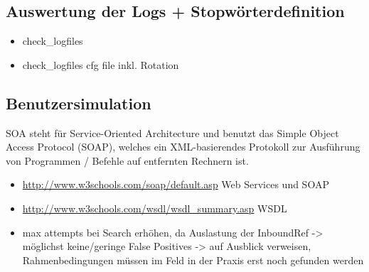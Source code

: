 \subsection{Auswertung der Logs + Stopwörterdefinition}
\begin{itemize}
\item check\_logfiles
\item check\_logfiles cfg file inkl. Rotation
\end{itemize}

\subsection{Benutzersimulation}
\gls{SOA} steht für Service-Oriented Architecture und benutzt das Simple Object Access Protocol (\gls{SOAP}), welches ein \gls{XML}-basierendes Protokoll zur Ausführung von Programmen / Befehle auf entfernten Rechnern ist.

\begin{itemize}
\item \url{http://www.w3schools.com/soap/default.asp} Web Services und SOAP
\item \url{http://www.w3schools.com/wsdl/wsdl_summary.asp} WSDL
\item max attempts bei Search erhöhen, da Auslastung der InboundRef -> möglichst keine/geringe False Positives -> auf Ausblick verweisen, Rahmenbedingungen müssen im Feld in der Praxis erst noch gefunden werden
\end{itemize}

